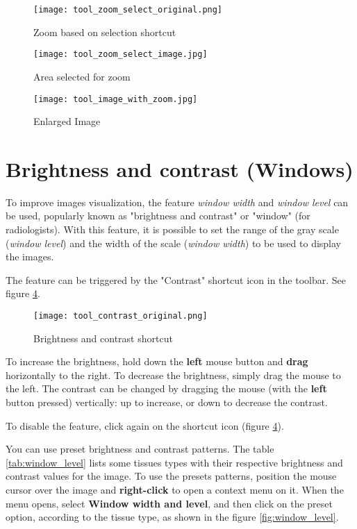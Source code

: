 \begin{figure}[!htb]
\centering
\texttt{[image: tool\_zoom\_select\_original.png]}
\caption{Zoom based on selection shortcut}
\label{fig:zoom_icon_loc}
\end{figure}

\begin{figure}[!htb]
\centering
\texttt{[image: tool\_zoom\_select\_image.jpg]}
\caption{Area selected for zoom}
\label{fig:zoom_select}
\end{figure}

\begin{figure}[!htb]
\centering
\texttt{[image: tool\_image\_with\_zoom.jpg]}
\caption{Enlarged Image}
\label{fig:zoom_applied}
\end{figure}


\section{Brightness and contrast (Windows)}
\label{sec:ww_wl}

To improve images visualization, the feature \textit{window width} and \textit{window level} can be used, popularly known as "brightness and contrast" or "window" (for radiologists). With this feature, it is possible to set the range of the gray scale (\textit{window level}) and the width of the scale (\textit{window width}) to be used to display the images.

The feature can be triggered by the "Contrast" shortcut icon in the toolbar. See figure \ref{fig:window_level_shortcut}.

\begin{figure}[!htb]
\centering
\texttt{[image: tool\_contrast\_original.png]}
\caption{Brightness and contrast shortcut}
\label{fig:window_level_shortcut}
\end{figure}

To increase the brightness, hold down the \textbf{left} mouse button and \textbf{drag} horizontally to the right. To decrease the brightness, simply drag the mouse to the left. The contrast can be changed by dragging the mouse (with the \textbf{left} button pressed) vertically: up to increase, or down to decrease the contrast.

To disable the feature, click again on the shortcut icon (figure \ref{fig:window_level_shortcut}).

You can use preset brightness and contrast patterns. The table \ref{tab:window_level} lists some tissues types with their respective brightness and contrast values ​​for the image. To use the presets patterns, position the mouse cursor over the image and \textbf{right-click} to open a context menu on it. When the menu opens, select \textbf{Window width and level}, and then click on the preset option, according to the tissue type, as shown in the figure \ref{fig:window_level}.

